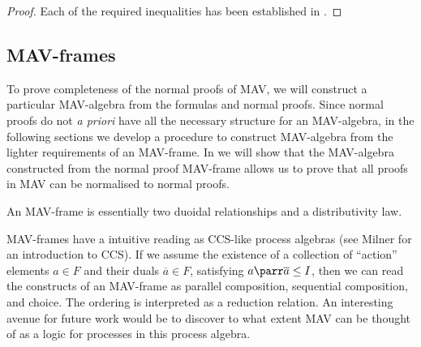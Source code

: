 
\begin{proof}
  Each of the required inequalities has been established in
  .
\end{proof}

\subsection{MAV-frames}

To prove completeness of the normal proofs of MAV, we will construct a
particular MAV-algebra from the formulas and normal proofs. Since
normal proofs do not \emph{a priori} have all the necessary structure
for an MAV-algebra, in the following sections we develop a procedure
to construct MAV-algebra from the lighter requirements of an
MAV-frame. In  we will show that
the MAV-algebra constructed from the normal proof MAV-frame allows us
to prove that all proofs in MAV can be normalised to normal proofs.


\begin{remark}
  An MAV-frame is essentially two duoidal relationships and a
  distributivity law.
\end{remark}

\begin{remark}
  MAV-frames have a intuitive reading as CCS-like process algebras
  (see Milner \cite{milner89} for an introduction to CCS). If we
  assume the existence of a collection of ``action'' elements
  $a \in F$ and their duals $\overline{a} \in F$, satisfying
  $a \parr \overline{a} \leq I$, then we can read the constructs of an
  MAV-frame as parallel composition, sequential composition, and
  choice. The ordering is interpreted as a reduction relation. An
  interesting avenue for future work would be to discover to what
  extent MAV can be thought of as a logic for processes in this
  process algebra.
\end{remark}

